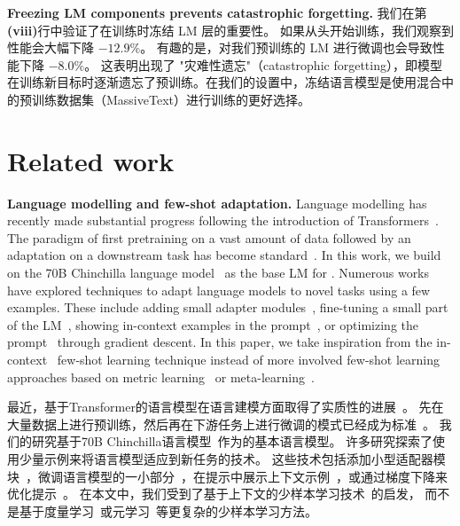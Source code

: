 \noindent
\textbf{Freezing LM components prevents catastrophic forgetting.} %
我们在第\textbf{(viii)}行中验证了在训练时冻结 LM 层的重要性。
如果从头开始训练，我们观察到性能会大幅下降 $-12.9\%$。
有趣的是，对我们预训练的 LM 进行微调也会导致性能下降 $-8.0\%$。
这表明出现了 "灾难性遗忘"（catastrophic forgetting），即模型在训练新目标时逐渐遗忘了预训练。在我们的设置中，冻结语言模型是使用混合中的预训练数据集（MassiveText）进行训练的更好选择。


\section{Related work}

\textbf{Language modelling and few-shot adaptation.}
Language modelling has recently made substantial progress following the introduction of Transformers~\citep{vaswani2017attention}.
The paradigm of first pretraining on a vast amount of data followed by an adaptation on a downstream task has become standard~\citep{mikolov2010recurrent,graves2013generating,jozefowicz2016exploring,howard2018universal,bert,t5,sutskever2011generating,gpt3}.
In this work, we build on the 70B Chinchilla language model~\citep{chinchilla} as the base LM for \largem{}.
Numerous works have explored techniques to adapt language models to novel tasks using a few examples.
These include adding small adapter modules~\citep{houlsby2019parameter}, fine-tuning a small part of the LM~\citep{zaken_bitfit_2022}, showing in-context examples in the prompt~\citep{gpt3}, or optimizing the prompt~\citep{li2021prefix,lester2021power} through gradient descent.
In this paper, we take inspiration from the in-context~\citep{gpt3} few-shot learning technique instead of more involved few-shot learning approaches based on metric learning~\citep{doersch2020crosstransformers,vinyals2016matching,snell2017prototypical,tian2020rethinking} or meta-learning~\citep{finn2017model,bertinetto2018meta,zintgraf2019fast,requeima2019fast,gordon2018meta,bertinetto2016learning}.

最近，基于Transformer的语言模型在语言建模方面取得了实质性的进展~\citep{vaswani2017attention}。 先在大量数据上进行预训练，然后再在下游任务上进行微调的模式已经成为标准~\citep{mikolov2010recurrent,graves2013generating,jozefowicz2016exploring,howard2018universal,bert,t5,sutskever2011generating,gpt3}。 我们的研究基于70B Chinchilla语言模型~\citep{chinchilla}作为\largem{}的基本语言模型。 
许多研究探索了使用少量示例来将语言模型适应到新任务的技术。 这些技术包括添加小型适配器模块~\citep{houlsby2019parameter}，微调语言模型的一小部分~\citep{zaken_bitfit_2022}，在提示中展示上下文示例~\citep{gpt3}，或通过梯度下降来优化提示~\citep{li2021prefix,lester2021power}。 在本文中，我们受到了基于上下文的少样本学习技术~\citep{gpt3}的启发，
而不是基于度量学习~\citep{doersch2020crosstransformers,vinyals2016matching,snell2017prototypical,tian2020rethinking}或元学习~\citep{finn2017model,bertinetto2018meta,zintgraf2019fast,requeima2019fast,gordon2018meta,bertinetto2016learning}等更复杂的少样本学习方法。

